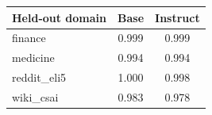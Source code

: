 \begin{tabular}{lcc}
\toprule
Held-out domain & Base & Instruct \\
\midrule
finance & 0.999 & 0.999 \\
medicine & 0.994 & 0.994 \\
reddit\_eli5 & 1.000 & 0.998 \\
wiki\_csai & 0.983 & 0.978 \\
\bottomrule
\end{tabular}
